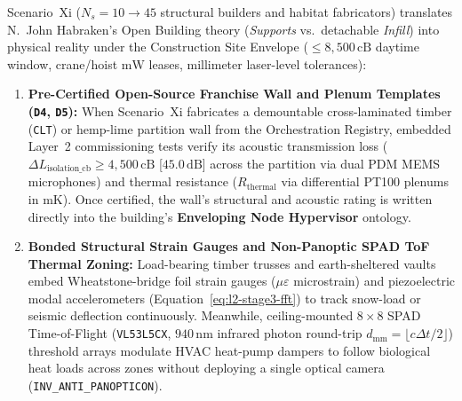 Scenario~Xi ($N_s = 10 \to 45$ structural builders and habitat fabricators) translates N.~John Habraken's Open Building theory (\textit{Supports} vs.\ detachable \textit{Infill}) \parencite{habraken1972supports} into physical reality under the Construction Site Envelope ($\le 8{,}500\,\mathrm{cB}$ daytime window, crane/hoist $\mathrm{mW}$ leases, millimeter laser-level tolerances):
\begin{enumerate}
    \item \textbf{Pre-Certified Open-Source Franchise Wall and Plenum Templates (\texttt{D4}, \texttt{D5}):} When Scenario~Xi fabricates a demountable cross-laminated timber (\texttt{CLT}) or hemp-lime partition wall from the Orchestration Registry, embedded Layer~2 commissioning tests verify its acoustic transmission loss ($\Delta L_{\mathrm{isolation\_cb}} \ge 4{,}500\,\mathrm{cB}$ [$45.0\,\mathrm{dB}$] across the partition via dual PDM MEMS microphones) and thermal resistance ($R_{\mathrm{thermal}}$ via differential PT100 plenums in $\mathrm{mK}$). Once certified, the wall's structural and acoustic rating is written directly into the building's \textbf{Enveloping Node Hypervisor} ontology.
    \item \textbf{Bonded Structural Strain Gauges and Non-Panoptic SPAD ToF Thermal Zoning:} Load-bearing timber trusses and earth-sheltered vaults embed Wheatstone-bridge foil strain gauges ($\mu\varepsilon$ microstrain) and piezoelectric modal accelerometers (Equation~\eqref{eq:l2-stage3-fft}) to track snow-load or seismic deflection continuously. Meanwhile, ceiling-mounted $8 \times 8$ SPAD Time-of-Flight (\texttt{VL53L5CX}, $940\,\mathrm{nm}$ infrared photon round-trip $d_{\mathrm{mm}} = \lfloor c\Delta t/2\rfloor$) threshold arrays modulate HVAC heat-pump dampers to follow biological heat loads across zones without deploying a single optical camera (\texttt{INV\_ANTI\_PANOPTICON}).
\end{enumerate}
